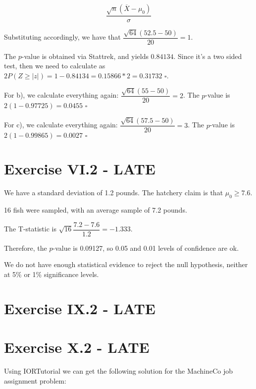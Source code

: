 \documentclass[titlepage, letterpaper]{article}
\newcommand{\qed}{\,\,\square}
\begin{document}
$$\frac{\sqrt{n}(\overline{X} - \mu_0)}{\sigma}$$

Substituting accordingly, we have that $\dfrac{\sqrt{64}(52.5 - 50)}{20} = 1$.

The $p$-value is obtained via Stattrek, and yields $0.84134$.
Since it's a two sided test, then we need to calculate as $2P(Z \geq |z|) = 1 - 0.84134 = 0.15866 * 2 = 0.31732 \qed$.

For b), we calculate everything again: $\dfrac{\sqrt{64}(55 - 50)}{20} = 2$.
The $p$-value is $2(1 - 0.97725) = 0.0455 \qed$

For c), we calculate everything again: $\dfrac{\sqrt{64}(57.5 - 50)}{20} = 3$.
The $p$-value is $2(1 - 0.99865) = 0.0027 \qed$


\section{Exercise VI.2 - LATE} %
\label{sec:exercise_vi_2}

We have a standard deviation of 1.2 pounds.
The hatchery claim is that $\mu_0 \geq 7.6$.

16 fish were sampled, with an average sample of 7.2 pounds.

The T-statistic is $\sqrt{16} \dfrac{7.2 - 7.6}{1.2} = -1.333$.

Therefore, the $p$-value is 0.09127, so 0.05 and 0.01 levels of confidence are ok.

We do not have enough statistical evidence to reject the null hypothesis, neither at 5\% or 1\% significance levels.

\section{Exercise IX.2 - LATE} %
\label{sec:exercise_ix_2}


\section{Exercise X.2 - LATE} %
\label{sec:exercise_x_2}

Using IORTutorial we can get the following solution for the MachineCo job assignment problem:
\end{document}
